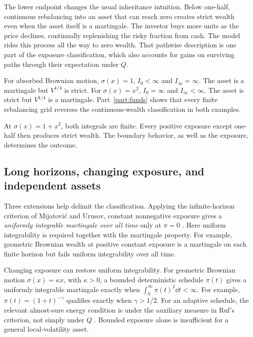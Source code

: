 The lower endpoint changes the usual inheritance intuition. Below one-half,
continuous rebalancing into an asset that can reach zero creates strict wealth
even when the asset itself is a martingale. The investor buys more units as
the price declines, continually replenishing the risky fraction from cash.
The model rides this process all the way to zero wealth. That pathwise
description is one part of the exposure classification, which also accounts
for gains on surviving paths through their expectation under $Q$.

\begin{example}\label{ex:reversal}
For absorbed Brownian motion, $\sigma(x)=1$, $I_0<\infty$ and
$I_\infty=\infty$. The asset is a martingale but $V^{1/4}$ is strict.
For $\sigma(x)=x^2$, $I_0=\infty$ and $I_\infty<\infty$.
The asset is strict but $V^{1/4}$ is a martingale. Part~\ref{part:funds}
shows that every finite rebalancing grid reverses the continuous-wealth
classification in both examples.
\end{example}

At $\sigma(x)=1+x^2$, both integrals are finite. Every positive exposure except
one-half then produces strict wealth. The boundary behavior, as well as
the exposure, determines the outcome.

\subsection{Long horizons, changing exposure, and independent assets}
Three extensions help delimit the classification. Applying the
infinite-horizon criterion of Mijatovi\'c and Urusov, constant nonnegative
exposure gives a \emph{uniformly integrable martingale over all time} only at
$\pi=0$ \cite{mijatovic2010martingale}. Here uniform integrability is required together with the martingale
property. For example, geometric Brownian wealth at positive constant
exposure is a martingale on each finite horizon but fails uniform
integrability over all time.

Changing exposure can restore uniform integrability. For geometric Brownian
motion $\sigma(x)=\kappa x$, with $\kappa>0$, a bounded deterministic schedule
$\pi(t)$ gives a uniformly integrable martingale exactly when
$\int_0^\infty\pi(t)^2\dd t<\infty$. For example,
$\pi(t)=(1+t)^{-\gamma}$ qualifies exactly when $\gamma>1/2$.
For an adaptive schedule, the relevant almost-sure energy condition is under
the auxiliary measure in Ruf's criterion, not simply under $Q$
\cite{ruf2015martingale}. Bounded exposure alone is insufficient for a general
local-volatility asset.

